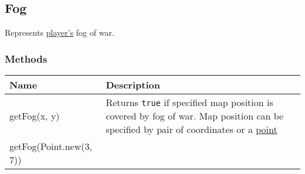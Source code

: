 \subsection{Fog}
\label{Fog}
Represents \hyperref[Player]{player's} fog of war.
\subsubsection{Methods}
\begin{center}
\begin{tabularx}{\linewidth}{| l | X |}
\hline
\textbf{Name} & \textbf{Description} \\
\hline
getFog(x, y) & Returns \texttt{true} if specified map position is covered by fog of war. Map position can be specified by pair of coordinates or a \hyperref[Point]{point}\\
getFog(Point.new(3, 7)) &\\
\hline
\end{tabularx}
\end{center}